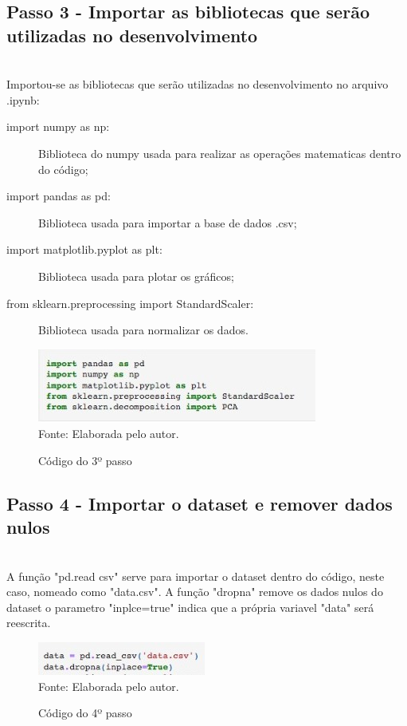 \documentclass[a4paper, 12pt]{article}
\begin{document}
\subsection{Passo 3 - Importar as bibliotecas que serão utilizadas no desenvolvimento}

\\Importou-se as bibliotecas que serão utilizadas no desenvolvimento no arquivo .ipynb:

\begin{itemize}
  \begin{description}
    \item[import numpy as np:] Biblioteca do numpy usada para realizar as operações matematicas dentro do código;
    \item[import pandas as pd:] Biblioteca usada para importar a base de dados .csv;
    \item[import matplotlib.pyplot as plt:] Biblioteca usada para plotar os gráficos;
    \item[from sklearn.preprocessing import StandardScaler:] Biblioteca usada para normalizar os dados.
  \end{description}
\end{itemize}

 \begin{figure}[!ht]
        \centering
        \caption{Código do 3º passo}
        \includegraphics[scale=0.5]{passo3.jpg} \\
        {\footnotesize Fonte: Elaborada pelo autor.}
        \label{fig:my_label}
    \end{figure}

\newpage

\subsection{Passo 4 - Importar o dataset e remover dados nulos}

\\A função "pd.read csv" serve para importar o dataset dentro do código, neste caso, nomeado como "data.csv".
A função "dropna" remove os dados nulos do dataset o parametro "inplce=true" indica que a própria variavel
"data" será reescrita.

     \begin{figure}[!ht]
        \centering
        \caption{Código do 4º passo}
        \includegraphics[scale=0.5]{passo4.jpg} \\
        {\footnotesize Fonte: Elaborada pelo autor.}
        \label{fig:my_label}
    \end{figure}
\end{document}
